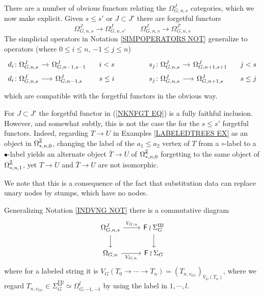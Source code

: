 \documentclass[a4paper,10pt]{article}%
\begin{document}
There are a number of obvious functors relating the $\Omega_{G,n,s}^{J}$ categories, which we now make explicit.
Given $s\leq s'$ or $J \subset J'$ there are forgetful functors
\begin{equation}\label{NKNFGT EQ}
  \Omega_{G,n,s}^{J} \to \Omega_{G,n,s'}^{J}
  \qquad
  \Omega_{G,n,s}^{J} \to \Omega_{G,n,s}^{J'}
\end{equation}
The simplicial operators in Notation \ref{SIMPOPERATORS NOT}
generalize to operators (where $0 \leq i \leq n$, $-1\leq j \leq n$)
\[
\begin{tikzcd}[row sep =0,column sep =1em]
  d_i \colon 
  \Omega_{G,n,s}^{J} \ar{r} &
  \Omega_{G,n-1,s-1}^{J} &
  i < s & & & &
  s_j \colon 
  \Omega_{G,n,s}^{J} \ar{r} &
  \Omega_{G,n+1,s+1}^{J} &
  j < s
  \\
  d_i \colon 
  \Omega_{G,n,s}^{J} \ar{r} &
  \Omega_{G,n-1,s}^{J} &
  s \leq i & & & &
  s_j \colon 
  \Omega_{G,n,s}^{J} \ar{r} &
  \Omega_{G,n+1,s}^{J} &
  s \leq j
\end{tikzcd}
\]
which are compatible with the forgetful functors in the obvious way.


\begin{remark}
  For $J \subset J'$ the forgetful functor in (\ref{NKNFGT EQ}) is a fully faithful inclusion. 
  However, and somewhat subtly, this is not the case the for the $ s \leq s'$ forgetful functors. Indeed, regarding
  $T \to U$ in Examples \ref{LABELEDTREES EX} as an object in 
  $\Omega_{\**,n,0}^{\underline{2}}$, changing the label of the $a_1 \leq a_2$ vertex of $T$ from a $\circ$-label to a $\bullet$-label yields an alternate object $\bar{T} \to U$
  of $\Omega_{\**,n,0}^{\underline{2}}$ forgetting to the same object of $\Omega_{\**,n,1}^{\underline{2}}$, yet $T \to U$ and $\bar{T} \to U$ are not isomorphic.
  
  We note that this is a consequence of the fact that substitution data can replace unary nodes by stumps, which have no nodes.
\end{remark}

Generalizing Notation \ref{INDVNG NOT} there is a commutative diagram 
\[
\begin{tikzcd}
  \Omega_{G,n,s}^{J} \ar{r}{V_{G,n}} \ar{d}& 
  \Fin \wr \Sigma_G^{\amalg l} \ar{d}
  \\
  \Omega_{G,n} \ar{r}[swap]{V_{G,n}} &
  \Fin \wr \Sigma_G
\end{tikzcd}
\]
where for a labeled string it is 
$V_G(T_0 \to \cdots \to T_n) =
(T_{n,v_{Ge}})_{V_G(T_n)}$, where we regard 
$T_{n,v_{Ge}} \in \Sigma_G^{\amalg l} \simeq \Omega_{G,-1,-1}^{\underline{l}}$ by using the label in $1,\cdots, l$.
\end{document}
